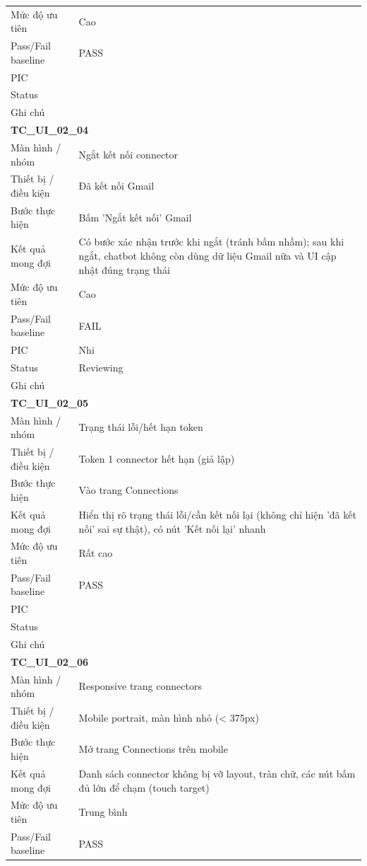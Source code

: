 \documentclass[12pt,a4paper]{article}
\begin{document}
\begin{longtable}{p{3.0cm}p{11.5cm}}
Mức độ ưu tiên & Cao \\
Pass/Fail baseline & PASS \\
PIC &  \\
Status &  \\
Ghi chú &  \\
\midrule
\multicolumn{2}{l}{\textbf{TC\_UI\_02\_04}} \\
Màn hình / nhóm & Ngắt kết nối connector \\
Thiết bị / điều kiện & Đã kết nối Gmail \\
Bước thực hiện & Bấm 'Ngắt kết nối' Gmail \\
Kết quả mong đợi & Có bước xác nhận trước khi ngắt (tránh bấm nhầm); sau khi ngắt, chatbot không còn dùng dữ liệu Gmail nữa và UI cập nhật đúng trạng thái \\
Mức độ ưu tiên & Cao \\
Pass/Fail baseline & FAIL \\
PIC & Nhi \\
Status & Reviewing \\
Ghi chú &  \\
\midrule
\multicolumn{2}{l}{\textbf{TC\_UI\_02\_05}} \\
Màn hình / nhóm & Trạng thái lỗi/hết hạn token \\
Thiết bị / điều kiện & Token 1 connector hết hạn (giả lập) \\
Bước thực hiện & Vào trang Connections \\
Kết quả mong đợi & Hiển thị rõ trạng thái lỗi/cần kết nối lại (không chỉ hiện 'đã kết nối' sai sự thật), có nút 'Kết nối lại' nhanh \\
Mức độ ưu tiên & Rất cao \\
Pass/Fail baseline & PASS \\
PIC &  \\
Status &  \\
Ghi chú &  \\
\midrule
\multicolumn{2}{l}{\textbf{TC\_UI\_02\_06}} \\
Màn hình / nhóm & Responsive trang connectors \\
Thiết bị / điều kiện & Mobile portrait, màn hình nhỏ (< 375px) \\
Bước thực hiện & Mở trang Connections trên mobile \\
Kết quả mong đợi & Danh sách connector không bị vỡ layout, tràn chữ, các nút bấm đủ lớn để chạm (touch target) \\
Mức độ ưu tiên & Trung bình \\
Pass/Fail baseline & PASS \\

\end{longtable}
\end{document}
